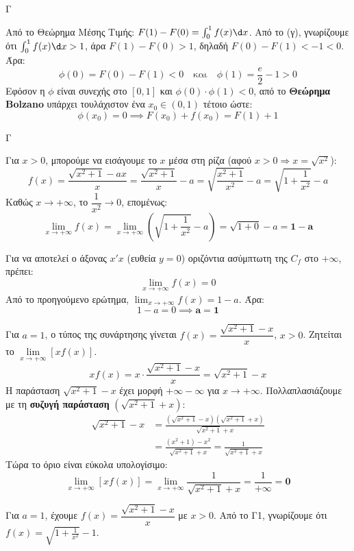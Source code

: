 \begin{thema}{Γ}
\begin{erwthma}
Από το Θεώρημα Μέσης Τιμής: $F(1) - F(0) = \int_0^1 f(x)\d x$.
Από το (γ), γνωρίζουμε ότι $\int_0^1 f(x)\d x > 1$, άρα $F(1) - F(0) > 1$, δηλαδή $F(0) - F(1) < -1 < 0$.
Άρα:
\[ \phi(0) = F(0) - F(1) < 0 \quad \text{και} \quad \phi(1) = \frac{e}{2} - 1 > 0 \]
Εφόσον η $\phi$ είναι συνεχής στο $[0,1]$ και $\phi(0) \cdot \phi(1) < 0$, από το \textbf{Θεώρημα Bolzano} υπάρχει τουλάχιστον ένα $x_0 \in (0, 1)$ τέτοιο ώστε:
\[ \phi(x_0) = 0 \implies F(x_0) + f(x_0) = F(1) + 1 \]
\end{erwthma}
\end{thema}

\begin{thema}{Γ}
\begin{erwthma}
\item Για $x > 0$, μπορούμε να εισάγουμε το $x$ μέσα στη ρίζα (αφού $x > 0 \Rightarrow x = \sqrt{x^2}$):
\[ f(x) = \frac{\sqrt{x^2+1} - ax}{x} = \frac{\sqrt{x^2+1}}{x} - a = \sqrt{\frac{x^2+1}{x^2}} - a = \sqrt{1 + \frac{1}{x^2}} - a \]
Καθώς $x \to +\infty$, το $\dfrac{1}{x^2} \to 0$, επομένως:
\[ \lim_{x \to +\infty} f(x) = \lim_{x \to +\infty} \left( \sqrt{1 + \frac{1}{x^2}} - a \right) = \sqrt{1+0} - a = \boldsymbol{1 - a} \]

\item Για να αποτελεί ο άξονας $x'x$ (ευθεία $y=0$) οριζόντια ασύμπτωτη της $C_f$ στο $+\infty$, πρέπει:
\[ \lim_{x \to +\infty} f(x) = 0 \]
Από το προηγούμενο ερώτημα, $\lim_{x \to +\infty} f(x) = 1 - a$. Άρα:
\[ 1 - a = 0 \implies \boldsymbol{a = 1} \]

\item Για $a = 1$, ο τύπος της συνάρτησης γίνεται $f(x) = \dfrac{\sqrt{x^2+1} - x}{x}$, $x > 0$. Ζητείται το $\lim\limits_{x \to +\infty} [x f(x)]$.
\[ x f(x) = x \cdot \frac{\sqrt{x^2+1} - x}{x} = \sqrt{x^2+1} - x \]
Η παράσταση $\sqrt{x^2+1} - x$ έχει μορφή $+\infty - \infty$ για $x \to +\infty$.
Πολλαπλασιάζουμε με τη \textbf{συζυγή παράσταση} $(\sqrt{x^2+1} + x)$:
\begin{align*}
\sqrt{x^2+1} - x &= \frac{(\sqrt{x^2+1} - x)(\sqrt{x^2+1} + x)}{\sqrt{x^2+1} + x} \\
&= \frac{(x^2+1) - x^2}{\sqrt{x^2+1} + x} = \frac{1}{\sqrt{x^2+1} + x}
\end{align*}
Τώρα το όριο είναι εύκολα υπολογίσιμο:
\[ \lim_{x \to +\infty} [x f(x)] = \lim_{x \to +\infty} \frac{1}{\sqrt{x^2+1} + x} = \frac{1}{+\infty} = \boldsymbol{0} \]

\item Για $a = 1$, έχουμε $f(x) = \dfrac{\sqrt{x^2+1}-x}{x}$ με $x > 0$.
Από το Γ1, γνωρίζουμε ότι $f(x) = \sqrt{1+\frac{1}{x^2}} - 1$.


\end{erwthma}
\end{thema}
